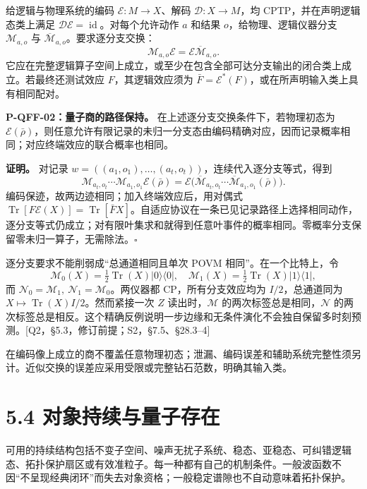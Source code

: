\documentclass[
  11pt,
  oneside]{book}
\begin{document}
给逻辑与物理系统的编码 \(\mathcal E:M\to X\)、解码
\(\mathcal D:X\to M\)，均 CPTP，并在声明逻辑态类上满足
\(\mathcal D\mathcal E=\operatorname{id}\)。对每个允许动作 \(a\) 和结果
\(o\)，给物理、逻辑仪器分支 \(\mathcal M_{a,o}\) 与
\(\overline{\mathcal M}_{a,o}\)。要求逐分支交换： \[
\mathcal M_{a,o}\mathcal E=\mathcal E\overline{\mathcal M}_{a,o}.
\]
它应在完整逻辑算子空间上成立，或至少在包含全部可达分支输出的闭合类上成立。若最终还测试效应
\(F\)，其逻辑效应须为
\(\bar F=\mathcal E^*(F)\)，或在所声明输入类上具有相同配对。

\protect\hypertarget{p-qff-02}{}{}

\textbf{P-QFF-02：量子商的路径保持。}
在上述逐分支交换条件下，若物理初态为
\(\mathcal E(\bar\rho)\)，则任意允许有限记录的未归一分支态由编码精确对应，因而记录概率相同；对应终端效应的联合概率也相同。

\textbf{证明。} 对记录
\(w=((a_1,o_1),\ldots,(a_t,o_t))\)，连续代入逐分支等式，得到 \[
\mathcal M_{a_t,o_t}\cdots\mathcal M_{a_1,o_1}\mathcal E(\bar\rho)
=\mathcal E\bigl(\overline{\mathcal M}_{a_t,o_t}\cdots
\overline{\mathcal M}_{a_1,o_1}(\bar\rho)\bigr).
\] 编码保迹，故两边迹相同；加入终端效应后，用对偶式
\(\operatorname{Tr}[F\mathcal E(X)]=\operatorname{Tr}[\bar F X]\)。自适应协议在一条已见记录路径上选择相同动作，逐分支等式仍成立；对有限叶集求和就得到任意叶事件的概率相同。零概率分支保留零未归一算子，无需除法。\(\square\)

逐分支要求不能削弱成``总通道相同且单次 POVM 相同''。在一个比特上，令 \[
\mathcal M_0(X)=\tfrac12\operatorname{Tr}(X)|0\rangle\langle0|,
\quad\mathcal M_1(X)=\tfrac12\operatorname{Tr}(X)|1\rangle\langle1|,
\] 而
\(\mathcal N_0=\mathcal M_1,\ \mathcal N_1=\mathcal M_0\)。两仪器都
CP，所有分支效应均为 \(I/2\)，总通道同为
\(X\mapsto\operatorname{Tr}(X)I/2\)。然而紧接一次 \(Z\)
读出时，\(\mathcal M\) 的两次标签总是相同，\(\mathcal N\)
的两次标签总是相反。这个精确反例说明一步边缘和无条件演化不会独自保留多时刻预测。{[}Q2，§5.3，修订前提；S2，§7.5、§28.3--4{]}

在编码像上成立的商不覆盖任意物理初态；泄漏、编码误差和辅助系统完整性须另计。近似交换的误差应采用受限或完整钻石范数，明确其输入类。

\hypertarget{ux5bf9ux8c61ux6301ux7eedux4e0eux91cfux5b50ux5b58ux5728}{%
\section{5.4
对象持续与量子存在}\label{ux5bf9ux8c61ux6301ux7eedux4e0eux91cfux5b50ux5b58ux5728}}

可用的持续结构包括不变子空间、噪声无扰子系统、稳态、亚稳态、可纠错逻辑态、拓扑保护扇区或有效准粒子。每一种都有自己的机制条件。一般波函数不因``不呈现经典闭环''而失去对象资格；一般稳定谱隙也不自动意味着拓扑保护。
\end{document}
